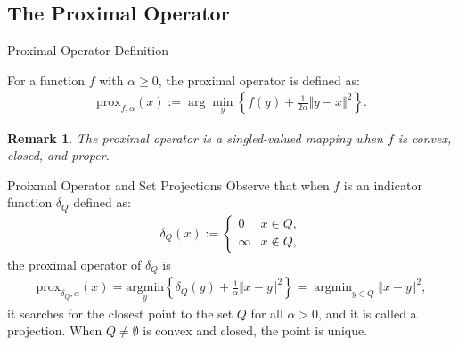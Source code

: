 \documentclass[11pt]{beamer}
\DeclareMathOperator {\argmin}{argmin}
\newtheorem{remark}{Remark}
\begin{document}
    \subsection{The Proximal Operator}
        \begin{frame}{Proximal Operator Definition}
            \begin{definition}
                For a function $f$ with $\alpha \ge 0$, the proximal operator is defined as: 
                \begin{align*}
                    \text{prox}_{f, \alpha}(x) := 
                    \arg\min_{y}\left\lbrace
                        f(y) + \frac{1}{2\alpha} \Vert y - x\Vert^2
                    \right\rbrace. 
                \end{align*}
            \end{definition}  
            \begin{remark}
                The proximal operator is a singled-valued mapping when $f$ is convex, closed, and proper. 
            \end{remark}
        \end{frame}
        \begin{frame}{Proixmal Operator and Set Projections}
            Observe that when $f$ is an indicator function $\delta_Q$ defined as: 
            \begin{align*}
                \delta_Q(x) := 
                \begin{cases}
                    0 & x \in Q,
                    \\
                    \infty  & x \not \in Q, 
                \end{cases}
            \end{align*}
            the proximal operator of $\delta_Q$ is
            \begin{align*}
               \text{prox}_{\delta_Q, \alpha}(x)=\underset{y}{\text{argmin}}
               \left\lbrace
                    \delta_Q(y) + \frac{1}{\alpha}\Vert x - y\Vert^2
               \right\rbrace = \argmin_{y\in Q}\Vert x - y\Vert^2,
            \end{align*}
            it searches for the closest point to the set $Q$ for all $\alpha > 0$, and it is called a projection. When $Q\neq \emptyset$ is convex and closed, the point is unique. 
        \end{frame}
\end{document}
